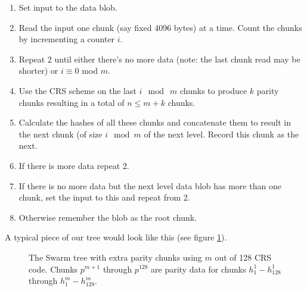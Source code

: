 \begin{enumerate}
\item Set input to the data blob.
\item Read the input one chunk (say fixed 4096 bytes) at a time. Count the chunks by incrementing a counter $i$. 
\item Repeat 2 until either there's no more data (note: the last chunk read may be shorter) or $i \equiv 0$ mod $m$.
\item Use the CRS scheme on the last $i \mod\ m$ chunks to produce $k$ parity chunks resulting in a total of $n \leq m+k$ chunks.
\item Calculate the hashes of all these chunks and concatenate them to result in the next chunk (of size $i\mod m$ of the next level. Record this chunk as the next.
\item If there is more data repeat 2. 
\item If there is no more data but the next level data blob has more than one chunk, set the input to this and repeat from 2.
\item Otherwise remember the blob as the root chunk.
\end{enumerate}


A typical piece of our tree would look like this (see figure \ref{fig:Swarm-hash-erasure}).


\begin{figure}[htbp]
   \centering
   
   \caption[Swarm hash erasure]{The Swarm tree with extra parity chunks using $m$ out of 128 CRS code. Chunks $p^{m+1}$ through $p^{128}$ are parity data for chunks $h^1_1 - h^1_{128}$ through $h^{m}_1  - h^{m}_{128}$.}
   \label{fig:Swarm-hash-erasure}
\end{figure}


